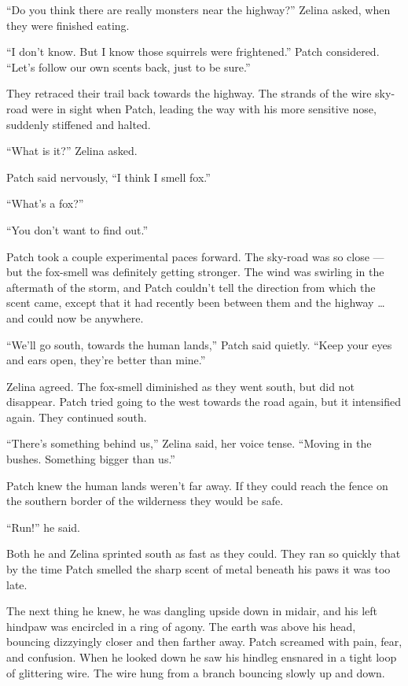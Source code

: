 \documentclass[ebook,oneside,openany,17pt]{memoir}
\begin{document}
“Do you think there are really monsters near the highway?” Zelina
asked, when they were finished eating.

“I don’t know. But I know those squirrels were frightened.” Patch
considered. “Let’s follow our own scents back, just to be sure.”

They retraced their trail back towards the highway. The strands of the
wire sky-road were in sight when Patch, leading the way with his more
sensitive nose, suddenly stiffened and halted.

“What is it?” Zelina asked.

Patch said nervously, “I think I smell fox.”

“What’s a fox?”

“You don’t want to find out.”

Patch took a couple experimental paces forward. The sky-road was so
close — but the fox-smell was definitely getting stronger. The wind
was swirling in the aftermath of the storm, and Patch couldn’t tell
the direction from which the scent came, except that it had recently
been between them and the highway … and could now be anywhere.

“We’ll go south, towards the human lands,” Patch said quietly. “Keep
your eyes and ears open, they’re better than mine.”

Zelina agreed. The fox-smell diminished as they went south, but did
not disappear. Patch tried going to the west towards the road again,
but it intensified again. They continued south.

“There’s something behind us,” Zelina said, her voice tense. “Moving
in the bushes. Something bigger than us.”

Patch knew the human lands weren’t far away. If they could reach the
fence on the southern border of the wilderness they would be safe.

“Run!” he said.

Both he and Zelina sprinted south as fast as they could. They ran so
quickly that by the time Patch smelled the sharp scent of metal
beneath his paws it was too late.

The next thing he knew, he was dangling upside down in midair, and his
left hindpaw was encircled in a ring of agony. The earth was above his
head, bouncing dizzyingly closer and then farther away. Patch screamed
with pain, fear, and confusion. When he looked down he saw his hindleg
ensnared in a tight loop of glittering wire. The wire hung from a
branch bouncing slowly up and down.
\end{document}

